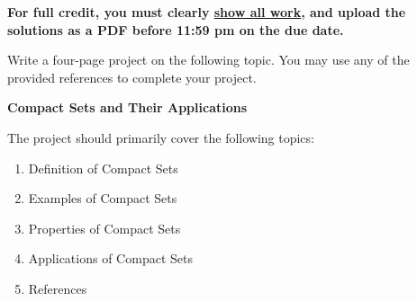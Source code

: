 \documentclass[11pt]{book}
\begin{document}
\thispagestyle{fancy}
\noindent	\textbf{For full credit, you must clearly \underline{show all work}, and upload the solutions as a PDF before 11:59 pm on the due date.}\hfill
\vspace{0.3in}

Write a four-page project on the following topic. You may use any of the provided references to complete your project.

\begin{center}
\textbf{Compact Sets and Their Applications}
\end{center}

\vspace{0.2in}

The project should primarily cover the following topics:

\begin{enumerate}
\item Definition of Compact Sets
\item Examples of Compact Sets
\item Properties of Compact Sets
\item Applications of Compact Sets
\item References
\end{enumerate}
\end{document}

